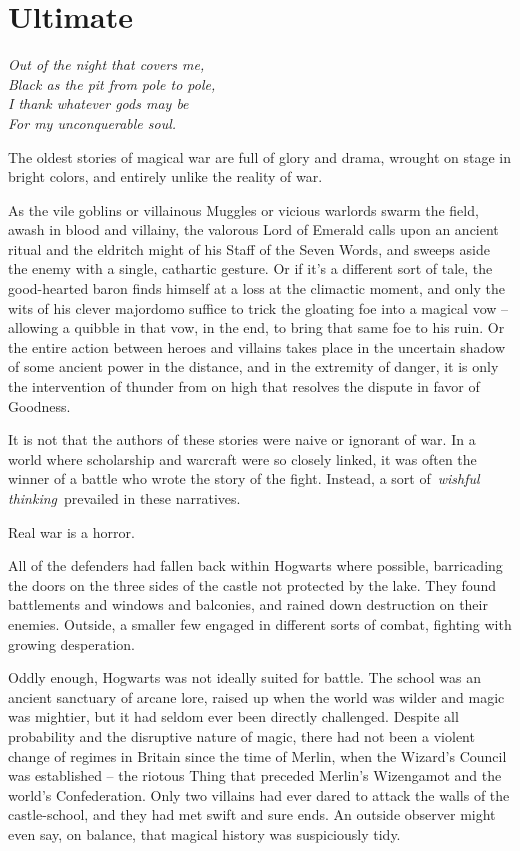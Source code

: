 \hypertarget{ultimate}{%
\chapter{Ultimate}\label{ultimate}}

\emph{Out of the night that covers me,}\\
\emph{Black as the pit from pole to pole,}\\
\emph{I thank whatever gods may be}\\
\emph{For my unconquerable soul.}\\

\mybreak

The oldest stories of magical war are full of glory and drama, wrought
on stage in bright colors, and entirely unlike the reality of war.

As the vile goblins or villainous Muggles or vicious warlords swarm the
field, awash in blood and villainy, the valorous Lord of Emerald calls
upon an ancient ritual and the eldritch might of his Staff of the Seven
Words, and sweeps aside the enemy with a single, cathartic gesture. Or
if it's a different sort of tale, the good-hearted baron finds himself
at a loss at the climactic moment, and only the wits of his clever
majordomo suffice to trick the gloating foe into a magical vow --
allowing a quibble in that vow, in the end, to bring that same foe to
his ruin. Or the entire action between heroes and villains takes place
in the uncertain shadow of some ancient power in the distance, and in
the extremity of danger, it is only the intervention of thunder from on
high that resolves the dispute in favor of Goodness.

It is not that the authors of these stories were naive or ignorant of
war. In a world where scholarship and warcraft were so closely linked,
it was often the winner of a battle who wrote the story of the fight.
Instead, a sort of~\emph{wishful thinking}~prevailed in these
narratives.

Real war is a horror.

\mybreak

All of the defenders had fallen back within Hogwarts where possible,
barricading the doors on the three sides of the castle not protected by
the lake. They found battlements and windows and balconies, and rained
down destruction on their enemies. Outside, a smaller few engaged in
different sorts of combat, fighting with growing desperation.

Oddly enough, Hogwarts was not ideally suited for battle. The school was
an ancient sanctuary of arcane lore, raised up when the world was wilder
and magic was mightier, but it had seldom ever been directly challenged.
Despite all probability and the disruptive nature of magic, there had
not been a violent change of regimes in Britain since the time of
Merlin, when the Wizard's Council was established -- the riotous Thing
that preceded Merlin's Wizengamot and the world's Confederation. Only
two villains had ever dared to attack the walls of the castle-school,
and they had met swift and sure ends. An outside observer might even
say, on balance, that magical history was suspiciously tidy.

